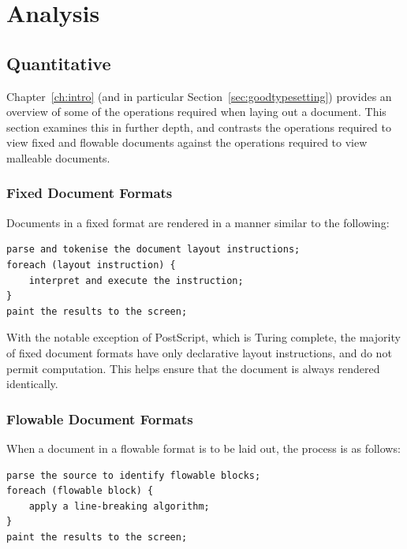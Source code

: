 \chapter{Analysis}\label{ch:analysis}



\section{Quantitative}

Chapter~\ref{ch:intro} (and in particular Section~\ref{sec:goodtypesetting}) provides an overview of some of the operations required when laying out a document. This section examines this in further depth, and contrasts the operations required to view fixed and flowable documents against the operations required to view malleable documents.

\subsection{Fixed Document Formats}
Documents in a fixed format are rendered in a manner similar to the following:
{\singlespacing
\begin{lstlisting}
parse and tokenise the document layout instructions;
foreach (layout instruction) {
    interpret and execute the instruction;
}
paint the results to the screen;
\end{lstlisting}
}
With the notable exception of PostScript, which is Turing complete, the majority of fixed document formats have only declarative layout instructions, and do not permit computation. This helps ensure that the document is always rendered identically.\hspace{0pt}\cite{Bagley2007}

\newpage
\subsection{Flowable Document Formats}

When a document in a flowable format is to be laid out, the process is as follows:
{\singlespacing
\begin{lstlisting}
parse the source to identify flowable blocks;
foreach (flowable block) {
    apply a line-breaking algorithm;
}
paint the results to the screen;
\end{lstlisting}
}

